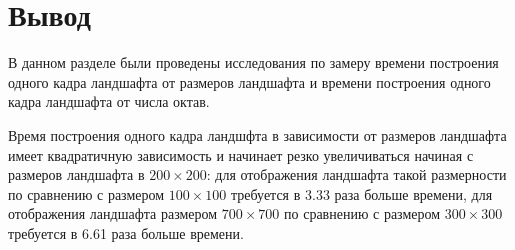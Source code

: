 \section*{Вывод}

В данном разделе были проведены исследования по замеру времени построения одного кадра ландшафта от размеров ландшафта и времени построения одного кадра  ландшафта от числа октав.

Время построения одного кадра ландшфта в зависимости от размеров ландшафта имеет квадратичную зависимость и начинает резко увеличиваться начиная с размеров ландшафта в $200\times200$: для отображения ландшафта такой размерности по сравнению с размером  $100\times100$ требуется в 3.33 раза больше времени, для отображения ландшафта размером $700\times700$ по сравнению с размером  $300\times300$ требуется в 6.61 раза больше времени.





